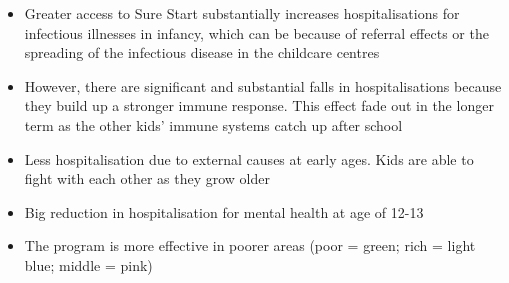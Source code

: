 \begin{itemize}
\begin{itemize}
\item Greater access to Sure
Start substantially increases hospitalisations for infectious illnesses in infancy, which can be because of referral effects or the spreading of the infectious disease in the childcare centres
\item However, there are significant and substantial falls in hospitalisations because they build up a
stronger immune response. This effect fade out in the longer term as the other kids' immune systems catch up after school
\item Less hospitalisation due to external causes at early ages. Kids are able to fight with each other as they grow older
\item Big reduction in hospitalisation for mental health at age of 12-13
\item The program is more effective in poorer areas (poor = green; rich = light blue; middle = pink)


\end{itemize}
\end{itemize}
